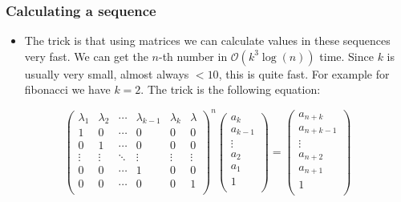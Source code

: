\documentclass{beamer}
\newcommand\p[1]{\left(#1\right)}
\begin{document}
\begin{frame}[plain]
    \frametitle{Calculating a sequence}

\begin{itemize}

\item The trick is that using matrices we can calculate values in these sequences very fast. We can get the $n$-th number in $\mathcal{O}(k^3 \log(n))$ time. Since $k$ is usually very small, almost always $< 10$, this is quite fast. For example for fibonacci we have $k = 2$. The trick is the following equation:

\end{itemize}

\[
\p{\begin{matrix}
\lambda_1 & \lambda_2 & \cdots & \lambda_{k-1} & \lambda_k & \lambda \\
1 & 0 & \cdots & 0 & 0 & 0 \\
0 & 1 & \cdots & 0 & 0 & 0 \\
\vdots & \vdots & \ddots & \vdots & \vdots & \vdots \\
0 & 0 & \cdots & 1 & 0 & 0 \\
0 & 0 & \cdots & 0 & 0 & 1 \\
\end{matrix}}^n
\p{\begin{matrix}
a_k \\ a_{k - 1} \\ \vdots \\ a_2 \\ a_1 \\ 1 \\
\end{matrix}}
=
\p{\begin{matrix}
a_{n + k} \\ a_{n + k - 1} \\ \vdots \\ a_{n + 2} \\ a_{n + 1} \\ 1 \\
\end{matrix}}
\]

\end{frame}
\end{document}
